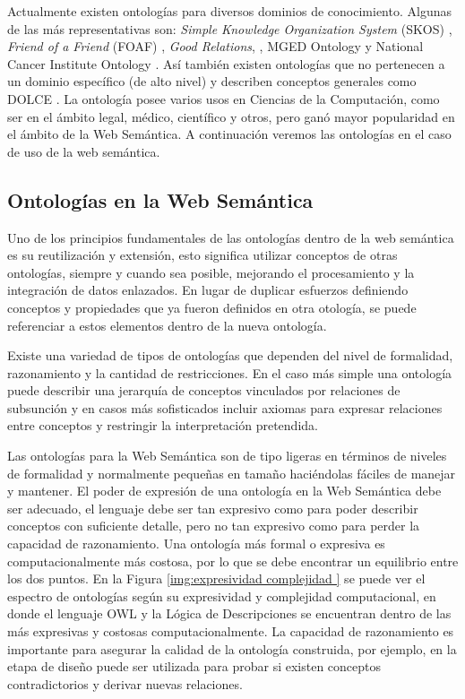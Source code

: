 Actualmente existen ontologías para diversos dominios de conocimiento. Algunas de las más representativas son: \textit{Simple Knowledge Organization System} (SKOS) \cite{isaac2009skos}, \textit{ Friend of a Friend} (FOAF) \cite{brickley2012foaf}, \textit{Good Relations}, \cite{hepp2008goodrelations}, MGED Ontology \cite{whetzel2006mged} y National Cancer Institute Ontology \cite{golbeck2011national}. Así también existen ontologías que no pertenecen a un dominio específico (de alto nivel) y describen conceptos generales como DOLCE \cite{Masolo02thewonderweb}.
La ontología posee varios usos en Ciencias de la Computación, como ser en el ámbito legal, médico, científico y otros, pero ganó mayor popularidad en el ámbito de la Web Semántica. A continuación veremos las ontologías en el caso de uso de la web semántica.


\subsection{Ontologías en la Web Semántica}
Uno de los principios fundamentales de las ontologías dentro de la web semántica es su reutilización y extensión, esto significa utilizar conceptos de otras ontologías, siempre y cuando sea posible, mejorando el procesamiento y la integración de datos enlazados. En lugar de duplicar esfuerzos definiendo conceptos y propiedades que ya fueron definidos en otra otología, se puede referenciar a estos elementos dentro de la nueva ontología. 

Existe una variedad de tipos de ontologías que dependen del nivel de formalidad, razonamiento y la cantidad de restricciones. En el caso más simple una ontología puede describir una jerarquía de conceptos vinculados por relaciones de subsunción y en casos más sofisticados incluir axiomas para expresar relaciones entre conceptos y restringir la interpretación pretendida.

Las ontologías para la Web Semántica son de tipo ligeras en términos de niveles de formalidad y normalmente pequeñas en tamaño haciéndolas fáciles de manejar y mantener. El poder de expresión de una ontología en la Web Semántica debe ser adecuado, el lenguaje debe ser tan expresivo como para poder describir conceptos con suficiente detalle, pero no tan expresivo como para perder la capacidad de razonamiento. Una ontología más formal o expresiva es computacionalmente más costosa, por lo que se debe encontrar un equilibrio entre los dos puntos. En la Figura \ref{img:expresividad complejidad } se puede ver el espectro de ontologías según su expresividad y complejidad computacional, en donde el lenguaje OWL y la Lógica de Descripciones se encuentran dentro de las más expresivas y costosas computacionalmente.
La capacidad de razonamiento es importante para asegurar la calidad de la ontología construida, por ejemplo, en la etapa de diseño puede ser utilizada para probar si existen conceptos contradictorios y derivar nuevas relaciones.

